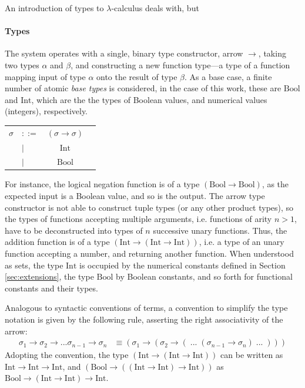 \documentclass[table, a4paper, 10pt]{book}
\begin{document}
An introduction of types to $\lambda$-calculus deals with, but 

\paragraph{Types}
The system operates with a single,
binary type constructor, arrow $\to$, taking two types $\alpha$ and $\beta$, and
constructing a new function type---a type of a function mapping input of type $\alpha$ onto the result of type $\beta$.
As a base case, a finite number of atomic \textit{base types} is considered, in the case
of this work, these are {\small$\mathrm{Bool}$} and {\small$\mathrm{Int}$}, which are the
the types of Boolean values, and numerical values (integers), respectively.
\begin{center}
\begin{tabular}{llcl}
$\sigma$ &$::=$             &$(\sigma \to \sigma)$     &\\
    &\hspace{0.1cm}$|$ &$\mathrm{Int}$ &\\
    &\hspace{0.1cm}$|$ &$\mathrm{Bool}$ &
\end{tabular}
\end{center}
For instance, the logical negation function is of a type {\small$(\mathrm{Bool} \to \mathrm{Bool})$}, as the expected input
is a Boolean value, and so is the output. The arrow type constructor is not able to
construct tuple types (or any other product types), so the types of functions
accepting multiple arguments, i.e. functions of arity $n>1$, have to be deconstructed into types of $n$ successive unary functions.
Thus, the addition function is of a type {\small$(\mathrm{Int} \to (\mathrm{Int} \to \mathrm{Int}))$}, i.e. a type
of an unary function accepting a number, and returning another function.
When understood as sets, the type {\small$\mathrm{Int}$} is occupied by the numerical constants defined in 
Section \ref{sec:extensions}, the type {\small$\mathrm{Bool}$} by Boolean constants, and 
so forth for functional constants and their types.

Analogous to syntactic conventions of terms, a convention to 
simplify the type notation is given by the following rule, asserting the right associativity of the arrow:
\begin{align*}
\sigma_1 \to \sigma_2 \to ... \sigma_{n-1} \to \sigma_n &\equiv (\sigma_1 \to (\sigma_2 \to (\;...\;(\sigma_{n-1} \to \sigma_n)\;...\;))) 
\end{align*}
Adopting the convention, the type {\small$(\mathrm{Int} \to (\mathrm{Int} \to \mathrm{Int}))$} can be written as
{\small$\mathrm{Int} \to \mathrm{Int} \to \mathrm{Int}$},
and {\small$(\mathrm{Bool} \to ((\mathrm{Int} \to \mathrm{Int}) \to \mathrm{Int}))$} as
{\small$\mathrm{Bool} \to (\mathrm{Int} \to \mathrm{Int}) \to \mathrm{Int}$}.
\end{document}
